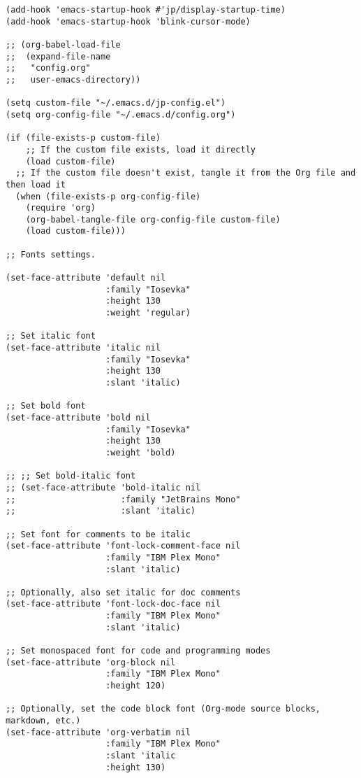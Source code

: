 \documentclass[11pt]{article}
\begin{document}
\begin{verbatim}
(add-hook 'emacs-startup-hook #'jp/display-startup-time)
(add-hook 'emacs-startup-hook 'blink-cursor-mode)

;; (org-babel-load-file
;;  (expand-file-name
;;   "config.org"
;;   user-emacs-directory))

(setq custom-file "~/.emacs.d/jp-config.el")
(setq org-config-file "~/.emacs.d/config.org")

(if (file-exists-p custom-file)
    ;; If the custom file exists, load it directly
    (load custom-file)
  ;; If the custom file doesn't exist, tangle it from the Org file and then load it
  (when (file-exists-p org-config-file)
    (require 'org)
    (org-babel-tangle-file org-config-file custom-file)
    (load custom-file)))

;; Fonts settings.

(set-face-attribute 'default nil
                    :family "Iosevka"
                    :height 130
                    :weight 'regular)

;; Set italic font
(set-face-attribute 'italic nil
                    :family "Iosevka"
                    :height 130
                    :slant 'italic)

;; Set bold font
(set-face-attribute 'bold nil
                    :family "Iosevka"
                    :height 130
                    :weight 'bold)

;; ;; Set bold-italic font
;; (set-face-attribute 'bold-italic nil
;;                     :family "JetBrains Mono"
;;                     :slant 'italic)

;; Set font for comments to be italic
(set-face-attribute 'font-lock-comment-face nil
                    :family "IBM Plex Mono"
                    :slant 'italic)

;; Optionally, also set italic for doc comments
(set-face-attribute 'font-lock-doc-face nil
                    :family "IBM Plex Mono"
                    :slant 'italic)

;; Set monospaced font for code and programming modes
(set-face-attribute 'org-block nil
                    :family "IBM Plex Mono"
                    :height 120)

;; Optionally, set the code block font (Org-mode source blocks, markdown, etc.)
(set-face-attribute 'org-verbatim nil
                    :family "IBM Plex Mono"
                    :slant 'italic
                    :height 130)



\end{verbatim}
\end{document}
